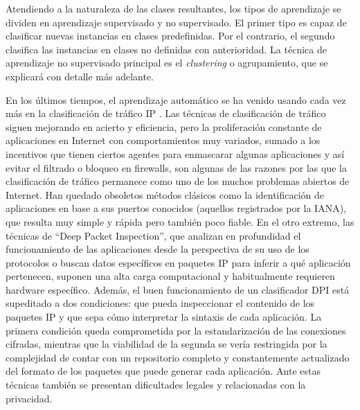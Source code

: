 Atendiendo a la naturaleza de las clases resultantes, los tipos de aprendizaje se dividen en aprendizaje supervisado y no supervisado.
El primer tipo es capaz de clasificar nuevas instancias en clases predefinidas.
Por el contrario, el segundo clasifica las instancias en clases no definidas con anterioridad.
La técnica de aprendizaje no supervisado principal es el \emph{clustering} o agrupamiento, que se explicará con detalle más adelante.

En los últimos tiempos, el aprendizaje automático se ha venido usando cada vez más en la clasificación de tráfico IP \cite{Dainotti_2012}.
Las técnicas de clasificación de tráfico siguen mejorando en acierto y eficiencia, pero
la proliferación constante de aplicaciones en Internet con comportamientos muy variados, sumado a
los incentivos que tienen ciertos agentes para enmascarar algunas aplicaciones y así evitar el filtrado o bloqueo en firewalls,
son algunas de las razones por las que la clasificación de tráfico permanece como uno de los muchos problemas abiertos de Internet.
Han quedado obsoletos métodos clásicos como la identificación de aplicaciones en base a sus puertos conocidos (aquellos registrados por la IANA), que resulta muy simple y rápida pero también poco fiable.
En el otro extremo, las técnicas de ``Deep Packet Inspection'', que analizan en profundidad el funcionamiento de las aplicaciones desde la perspectiva de su uso de los protocolos o
buscan datos específicos en paquetes IP para inferir a qué aplicación pertenecen, suponen una alta carga computacional y habitualmente requieren hardware específico.
Además, el buen funcionamiento de un clasificador DPI está supeditado a dos condiciones: que pueda inspeccionar el contenido de los paquetes IP y que sepa cómo interpretar la sintaxis de cada aplicación.
La primera condición queda comprometida por la estandarización de las conexiones cifradas,
mientras que la viabilidad de la segunda se vería restringida por la complejidad de contar con un repositorio completo y constantemente actualizado del formato de los paquetes que puede generar cada aplicación.
Ante estas técnicas también se presentan dificultades legales y relacionadas con la privacidad.

